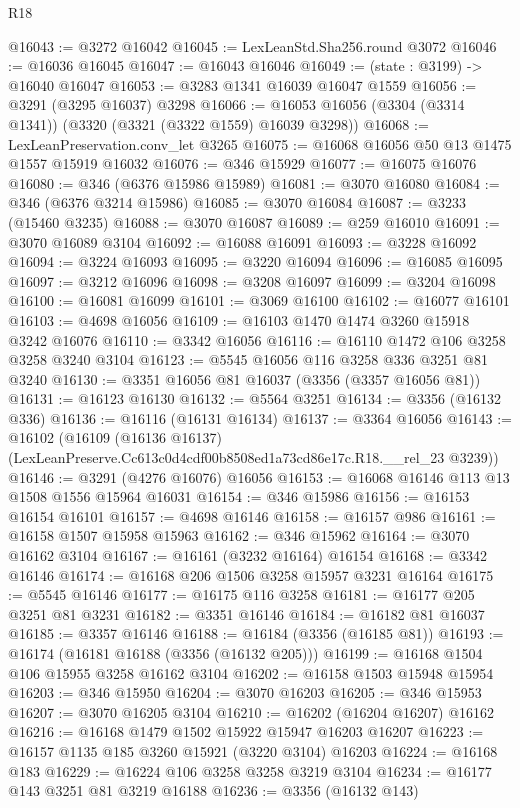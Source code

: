 \begin{lexlean}{R18}
\begin{coremodule}
@16043 := @3272 @16042
@16045 := LexLeanStd.Sha256.round @3072
@16046 := @16036 @16045
@16047 := @16043 @16046
@16049 := (state : @3199) -> @16040 @16047
@16053 := @3283 @1341 @16039 @16047 @1559
@16056 := @3291 (@3295 @16037) @3298
@16066 := @16053 @16056 (@3304 (@3314 @1341)) (@3320 (@3321 (@3322 @1559) @16039 @3298))
@16068 := LexLeanPreservation.conv_let @3265
@16075 := @16068 @16056 @50 @13 @1475 @1557 @15919 @16032
@16076 := @346 @15929
@16077 := @16075 @16076
@16080 := @346 (@6376 @15986 @15989)
@16081 := @3070 @16080
@16084 := @346 (@6376 @3214 @15986)
@16085 := @3070 @16084
@16087 := @3233 (@15460 @3235)
@16088 := @3070 @16087
@16089 := @259 @16010
@16091 := @3070 @16089 @3104
@16092 := @16088 @16091
@16093 := @3228 @16092
@16094 := @3224 @16093
@16095 := @3220 @16094
@16096 := @16085 @16095
@16097 := @3212 @16096
@16098 := @3208 @16097
@16099 := @3204 @16098
@16100 := @16081 @16099
@16101 := @3069 @16100
@16102 := @16077 @16101
@16103 := @4698 @16056
@16109 := @16103 @1470 @1474 @3260 @15918 @3242 @16076
@16110 := @3342 @16056
@16116 := @16110 @1472 @106 @3258 @3258 @3240 @3104
@16123 := @5545 @16056 @116 @3258 @336 @3251 @81 @3240
@16130 := @3351 @16056 @81 @16037 (@3356 (@3357 @16056 @81))
@16131 := @16123 @16130
@16132 := @5564 @3251
@16134 := @3356 (@16132 @336)
@16136 := @16116 (@16131 @16134)
@16137 := @3364 @16056
@16143 := @16102
    (@16109 (@16136 @16137) (LexLeanPreserve.Cc613c0d4cdf00b8508ed1a73cd86e17c.R18.__rel_23 @3239))
@16146 := @3291 (@4276 @16076) @16056
@16153 := @16068 @16146 @113 @13 @1508 @1556 @15964 @16031
@16154 := @346 @15986
@16156 := @16153 @16154 @16101
@16157 := @4698 @16146
@16158 := @16157 @986
@16161 := @16158 @1507 @15958 @15963
@16162 := @346 @15962
@16164 := @3070 @16162 @3104
@16167 := @16161 (@3232 @16164) @16154
@16168 := @3342 @16146
@16174 := @16168 @206 @1506 @3258 @15957 @3231 @16164
@16175 := @5545 @16146
@16177 := @16175 @116 @3258
@16181 := @16177 @205 @3251 @81 @3231
@16182 := @3351 @16146
@16184 := @16182 @81 @16037
@16185 := @3357 @16146
@16188 := @16184 (@3356 (@16185 @81))
@16193 := @16174 (@16181 @16188 (@3356 (@16132 @205)))
@16199 := @16168 @1504 @106 @15955 @3258 @16162 @3104
@16202 := @16158 @1503 @15948 @15954
@16203 := @346 @15950
@16204 := @3070 @16203
@16205 := @346 @15953
@16207 := @3070 @16205 @3104
@16210 := @16202 (@16204 @16207) @16162
@16216 := @16168 @1479 @1502 @15922 @15947 @16203 @16207
@16223 := @16157 @1135 @185 @3260 @15921 (@3220 @3104) @16203
@16224 := @16168 @183
@16229 := @16224 @106 @3258 @3258 @3219 @3104
@16234 := @16177 @143 @3251 @81 @3219 @16188
@16236 := @3356 (@16132 @143)

\end{coremodule}
\end{lexlean}
